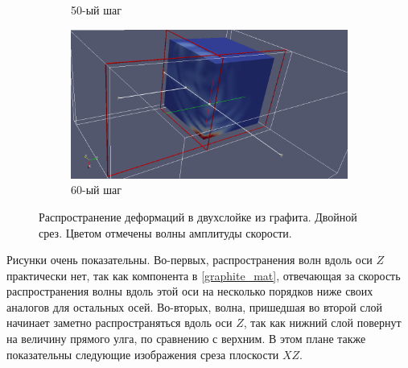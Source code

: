 \begin{figure}[H]
\begin{subfigure}[b]{0.5\textwidth}
\caption{50-ый шаг}
\end{subfigure}
\begin{subfigure}[b]{0.5\textwidth}
\centering
\includegraphics[width=1.0\textwidth]{png/two-graphite-layers/2clip60.png}
\caption{60-ый шаг}
\end{subfigure}
\caption{Распространение деформаций в двухслойке из графита. Двойной срез. Цветом отмечены волны амплитуды скорости.}
\label{pic:two_graphite_clip2}
\end{figure}

	Рисунки очень показательны.
	Во-первых, распространения волн вдоль оси $Z$ практически нет, так как компонента в \eqref{graphite_mat}, отвечающая за скорость распространения волны вдоль этой оси на несколько порядков ниже своих аналогов для остальных осей.
	Во-вторых, волна, пришедшая во второй слой начинает заметно распространяться вдоль оси $Z$, так как нижний слой повернут на величину прямого улга, по сравнению с верхним.
	В этом плане также показательны следующие изображения среза плоскости $XZ$.
	
